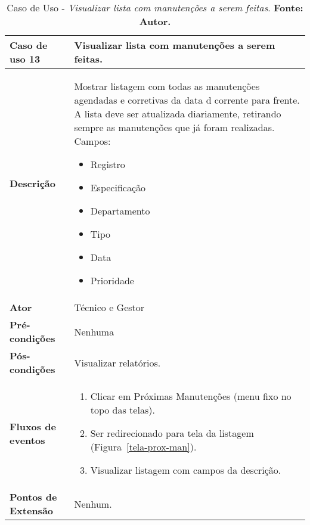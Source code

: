 \begin{apendicesenv}

\begin{table}[H]
\centering
\caption{Caso de Uso - \textit{Visualizar lista com manutenções a serem feitas}. \textbf{Fonte: Autor.}}
\label{uc13}
\begin{tabular}{ | p{5cm} | p{10cm} |  }
\hline
	\textbf{Caso de uso 13} & Visualizar lista com manutenções a serem feitas. \\ \hline
	\textbf{Descrição} & Mostrar listagem com todas as manutenções agendadas e corretivas da data d corrente para frente. A lista deve ser atualizada diariamente, retirando sempre as manutenções que já foram realizadas. Campos: \begin{itemize}
															                    \item Registro
															                    \item Especificação
															                    \item Departamento
															                    \item Tipo
															                    \item Data
															                    \item Prioridade 
															                    \end{itemize} \\ \hline
	\textbf{Ator} & Técnico e Gestor \\ \hline
	\textbf{Pré-condições} & Nenhuma \\ \hline
	\textbf{Pós-condições} & Visualizar relatórios. \\ \hline
	\textbf{Fluxos de eventos} & \begin{enumerate}
									\item Clicar em Próximas Manutenções (menu fixo no topo das telas).
									\item Ser redirecionado para  tela da listagem (Figura~\ref{tela-prox-man}).
									\item Visualizar listagem com campos da descrição.
								 \end{enumerate}   \\ \hline
	\textbf{Pontos de Extensão} & Nenhum. \\ \hline
\end{tabular}
\end{table}




\end{apendicesenv}
